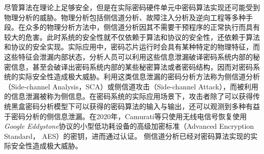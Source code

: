 {	尽管算法在理论上足够安全，但是在实际密码硬件单元中密码算法实现还可能受到物理分析的威胁。物理分析包括侧信道分析、故障注入分析\citep{Biham97}及逆向工程\citep{Perrin17}等多种手段。在众多的物理分析方法中，侧信道分析因其不需要干预程序的正常执行而具有较大的危害。此时系统的安全性就不仅依赖于算法和协议的安全性，还依赖于算法和协议的安全实现。实际应用中，密码芯片运行时会具有某种特定的物理特征，而这些特征会泄漏内部状态，分析人员可以利用这些信息泄漏破译密码系统内部的秘密信息，甚至会破译出密码系统内部的某些秘密算法或者密码结构，因而对密码系统的实际安全性造成极大威胁。利用这类信息泄漏的密码分析方法称为侧信道分析（Side-channel Analysis，SCA）或侧信道攻击（Side-channel Attack），而被利用的信息泄漏被称为侧信息。在密码系统的实际应用场景下，攻击者除了可以获得传统黑盒密码分析模型下可以获得的密码算法的输入与输出，还可以观测到多种有益于密码分析的侧信息泄漏。在2020年，Camurati等\citep{Camurati20}只使用无线电信号恢复使用\textit{Google Eddystone}\citep{Eddystone}协议的小型低功耗设备的高级加密标准（Advanced Encryption Standard， AES）的密钥，进而通过认证。
	侧信道分析已经对密码算法实现的实际安全性造成极大威胁。
	
}
